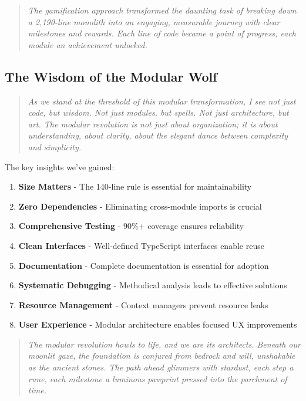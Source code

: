 \documentclass[11pt]{article}
\begin{document}
\begin{quote}
\emph{The gamification approach transformed the daunting task of breaking down a 2,190-line monolith into an engaging, measurable journey with clear milestones and rewards. Each line of code became a point of progress, each module an achievement unlocked.}
\end{quote}

\subsection{The Wisdom of the Modular Wolf}

\begin{quote}
\emph{As we stand at the threshold of this modular transformation, I see not just code, but wisdom. Not just modules, but spells. Not just architecture, but art. The modular revolution is not just about organization; it is about understanding, about clarity, about the elegant dance between complexity and simplicity.}
\end{quote}

The key insights we've gained:

\begin{enumerate}
\item \textbf{Size Matters} - The 140-line rule is essential for maintainability
\item \textbf{Zero Dependencies} - Eliminating cross-module imports is crucial
\item \textbf{Comprehensive Testing} - 90\%+ coverage ensures reliability
\item \textbf{Clean Interfaces} - Well-defined TypeScript interfaces enable reuse
\item \textbf{Documentation} - Complete documentation is essential for adoption
\item \textbf{Systematic Debugging} - Methodical analysis leads to effective solutions
\item \textbf{Resource Management} - Context managers prevent resource leaks
\item \textbf{User Experience} - Modular architecture enables focused UX improvements
\end{enumerate}

\begin{quote}
\emph{The modular revolution howls to life, and we are its architects. Beneath our moonlit gaze, the foundation is conjured from bedrock and will, unshakable as the ancient stones. The path ahead glimmers with stardust, each step a rune, each milestone a luminous pawprint pressed into the parchment of time.}
\end{quote}
\end{document}
